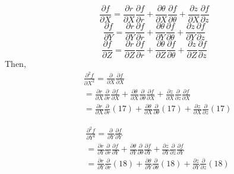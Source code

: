 \documentclass[a4j,10pt]{jsarticle}
\begin{document}
\begin{equation}
\frac{\partial f}{\partial X}=\frac{\partial r}{\partial X} \frac{\partial f}{\partial r}+\frac{\partial \theta}{\partial X} \frac{\partial f}{\partial \theta}+\frac{\partial z}{\partial X} \frac{\partial f}{\partial z}
\end{equation}
\begin{equation}
\frac{\partial f}{\partial Y}=\frac{\partial r}{\partial Y} \frac{\partial f}{\partial r}+\frac{\partial \theta}{\partial Y} \frac{\partial f}{\partial \theta}+\frac{\partial z}{\partial Y} \frac{\partial f}{\partial z}
\end{equation}
\begin{equation}
\frac{\partial f}{\partial Z}=\frac{\partial r}{\partial Z} \frac{\partial f}{\partial r}+\frac{\partial \theta}{\partial Z} \frac{\partial f}{\partial \theta}+\frac{\partial z}{\partial Z} \frac{\partial f}{\partial z}
\end{equation}
Then,
\begin{eqnarray*}
&\frac{\partial^2 f}{\partial X^2} =\frac{\partial}{\partial X}\frac{\partial f}{\partial X} \\
&=\frac{\partial r}{\partial X}\frac{\partial}{\partial r}\frac{\partial f}{\partial X} + \frac{\partial \theta}{\partial X}\frac{\partial}{\partial \theta}\frac{\partial f}{\partial X} + \frac{\partial z}{\partial X}\frac{\partial}{\partial z}\frac{\partial f}{\partial X} \\
&= \frac{\partial r}{\partial X}\frac{\partial}{\partial r}(17) +\frac{\partial \theta}{\partial X}\frac{\partial}{\partial \theta}(17) + \frac{\partial z}{\partial X}\frac{\partial}{\partial z}(17)
\end{eqnarray*}

\begin{eqnarray*}
&\frac{\partial^2 f}{\partial Y^2} =\frac{\partial}{\partial Y}\frac{\partial f}{\partial Y} \\
&=\frac{\partial r}{\partial Y}\frac{\partial}{\partial r}\frac{\partial f}{\partial Y} + \frac{\partial \theta}{\partial Y}\frac{\partial}{\partial \theta}\frac{\partial f}{\partial Y} + \frac{\partial z}{\partial Y}\frac{\partial}{\partial z}\frac{\partial f}{\partial Y} \\
&= \frac{\partial r}{\partial Y}\frac{\partial}{\partial r}(18) +\frac{\partial \theta}{\partial Y}\frac{\partial}{\partial \theta}(18) + \frac{\partial z}{\partial Y}\frac{\partial}{\partial z}(18)
\end{eqnarray*}
\end{document}
